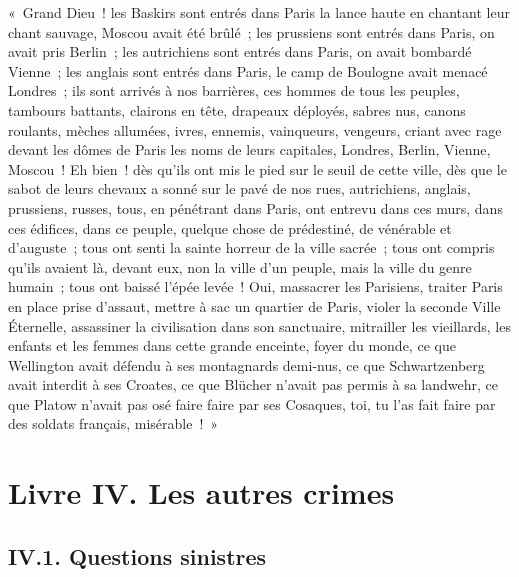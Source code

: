 \documentclass[french,twoside]{book} %
\newcommand\chapteropen{} %
\newcommand\chaptercont{} %
\newcommand\chapterclose{} %
\begin{document}
« Grand Dieu ! les Baskirs sont entrés dans Paris la lance haute en chantant leur chant sauvage, Moscou avait été brûlé ; les prussiens sont entrés dans Paris, on avait pris Berlin ; les autrichiens sont entrés dans Paris, on avait bombardé Vienne ; les anglais sont entrés dans Paris, le camp de Boulogne avait menacé Londres ; ils sont arrivés à nos barrières, ces hommes de tous les peuples, tambours battants, clairons en tête, drapeaux déployés, sabres nus, canons roulants, mèches allumées, ivres, ennemis, vainqueurs, vengeurs, criant avec rage devant les dômes de Paris les noms de leurs capitales, Londres, Berlin, Vienne, Moscou ! Eh bien ! dès qu’ils ont mis le pied sur le seuil de cette ville, dès que le sabot de leurs chevaux a sonné sur le pavé de nos rues, autrichiens, anglais, prussiens, russes, tous, en pénétrant dans Paris, ont entrevu dans ces murs, dans ces édifices, dans ce peuple, quelque chose de prédestiné, de vénérable et d’auguste ; tous ont senti la sainte horreur de la ville sacrée ; tous ont compris qu’ils avaient là, devant eux, non la ville d’un peuple, mais la ville du genre humain ; tous ont baissé l’épée levée ! Oui, massacrer les Parisiens, traiter Paris en place prise d’assaut, mettre à sac un quartier de Paris, violer la seconde Ville Éternelle, assassiner la civilisation dans son sanctuaire, mitrailler les vieillards, les enfants et les femmes dans cette grande enceinte, foyer du monde, ce que Wellington avait défendu à ses montagnards demi-nus, ce que Schwartzenberg avait interdit à ses Croates, ce que Blücher n’avait pas permis à sa landwehr, ce que Platow n’avait pas osé faire faire par ses Cosaques, toi, tu l’as fait faire par des soldats français, misérable ! »
\chapterclose


\chapteropen

\chapter[{Livre IV. Les autres crimes}]{Livre IV. Les autres crimes}
\renewcommand{\leftmark}{Livre IV. Les autres crimes}


\chaptercont

\section[{IV.1. Questions sinistres}]{IV.1. Questions sinistres}
\end{document}

